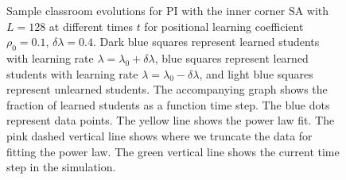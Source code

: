 \begin{figure}[htbp!]
   \caption[Example classroom evolution for heterogeneous PI set up with low positional learning factor $\rho_0$ and high heterogeneity $\delta\lambda$]{Sample classroom evolutions for PI with the inner corner SA with $L=128$ at different times $t$ for positional learning coefficient $\rho_0=0.1$, $\delta\lambda = 0.4$.
   Dark blue squares represent learned students with learning rate $\lambda = \lambda_0 + \delta\lambda$, blue squares represent learned students with learning rate $\lambda = \lambda_0 - \delta\lambda$, and light blue squares represent unlearned students.
   The accompanying graph shows the fraction of learned students as a function time step.
   The blue dots represent data points. 
   The yellow line shows the power law fit.
   The pink dashed vertical line shows where we truncate the data for fitting the power law.
   The green vertical line shows the current time step in the simulation.
   }
   \label{fig:2DBPCAIH sample class evolution low rho}
\end{figure}

